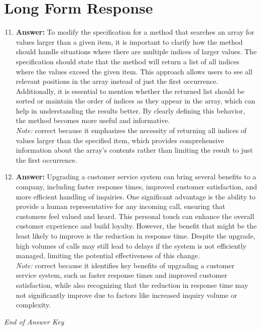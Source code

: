 \documentclass[12pt]{article}
\begin{document}
\section*{Long Form Response}
\begin{enumerate}[label=\arabic*.]
\setcounter{enumi}{10}
\item \textbf{Answer:} To modify the specification for a method that searches an array for values larger than a given item, it is important to clarify how the method should handle situations where there are multiple indices of larger values. The specification should state that the method will return a list of all indices where the values exceed the given item. This approach allows users to see all relevant positions in the array instead of just the first occurrence. Additionally, it is essential to mention whether the returned list should be sorted or maintain the order of indices as they appear in the array, which can help in understanding the results better. By clearly defining this behavior, the method becomes more useful and informative.
\\ \textit{Note:} correct because it emphasizes the necessity of returning all indices of values larger than the specified item, which provides comprehensive information about the array's contents rather than limiting the result to just the first occurrence.
\item \textbf{Answer:} Upgrading a customer service system can bring several benefits to a company, including faster response times, improved customer satisfaction, and more efficient handling of inquiries. One significant advantage is the ability to provide a human representative for any incoming call, ensuring that customers feel valued and heard. This personal touch can enhance the overall customer experience and build loyalty. However, the benefit that might be the least likely to improve is the reduction in response time. Despite the upgrade, high volumes of calls may still lead to delays if the system is not efficiently managed, limiting the potential effectiveness of this change.
\\ \textit{Note:} correct because it identifies key benefits of upgrading a customer service system, such as faster response times and improved customer satisfaction, while also recognizing that the reduction in response time may not significantly improve due to factors like increased inquiry volume or complexity.
\end{enumerate}

\vfill
\noindent\textit{End of Answer Key}
\end{document}
